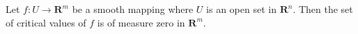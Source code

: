 Let $f: U \to \mathbf{R}^m$ be a smooth mapping where $U$ is an open set in $\mathbf{R}^n$. Then the set of critical values of $f$ is of measure zero in $\mathbf{R}^m$.
